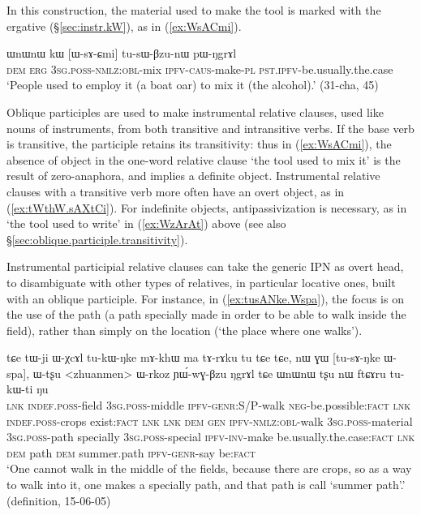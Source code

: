In this construction, the material used to make the tool is marked with the ergative (§\ref{sec:instr.kW}), as in (\ref{ex:WsACmi}).

\begin{exe}
\ex \label{ex:WsACmi}
\gll ɯnɯnɯ kɯ [ɯ-sɤ-ɕmi] tu-sɯ-βzu-nɯ pɯ-ŋgrɤl \\
\textsc{dem} \textsc{erg} \textsc{3sg}.\textsc{poss}-\textsc{nmlz}:\textsc{obl}-mix \textsc{ipfv}-\textsc{caus}-make-\textsc{pl} \textsc{pst}.\textsc{ipfv}-be.usually.the.case \\
\glt `People used to employ it (a boat oar) to mix it (the alcohol).' (31-cha, 45)
\end{exe}  

Oblique participles are used to make instrumental relative clauses, used like nouns of instruments, from both transitive and intransitive verbs. If the base verb is transitive, the participle retains its transitivity: thus in (\ref{ex:WsACmi}), the absence of object in the one-word relative clause  `the tool used to mix it' is the result of zero-anaphora, and implies a definite object. Instrumental relative clauses with a transitive verb more often have an overt object, as in (\ref{ex:tWthW.sAXtCi}). For indefinite objects, antipassivization is necessary, as in  `the tool used to write' in (\ref{ex:WzArAt}) above (see also  §\ref{sec:oblique.participle.transitivity}). 

Instrumental participial relative clauses can take the generic IPN  as overt head, to disambiguate with other types of relatives, in particular locative ones, built with an oblique participle. For instance, in (\ref{ex:tusANke.Wspa}), the focus is on the use of the path (a path specially made in order to be able to walk inside the field), rather than simply on the location (`the place where one walks').

\begin{exe}
\ex \label{ex:tusANke.Wspa}
\gll tɕe tɯ-ji ɯ-χcɤl tu-kɯ-ŋke mɤ-khɯ ma tɤ-rɤku tu tɕe tɕe, nɯ ɣɯ [tu-sɤ-ŋke ɯ-spa], ɯ-tʂu <zhuanmen> ɯ-rkoz ɲɯ́-wɣ-βzu ŋgrɤl tɕe ɯnɯnɯ tʂu nɯ ftɕɤru tu-kɯ-ti ŋu \\
\textsc{lnk} \textsc{indef}.\textsc{poss}-field \textsc{3sg}.\textsc{poss}-middle \textsc{ipfv}-\textsc{genr}:S/P-walk \textsc{neg}-be.possible:\textsc{fact} \textsc{lnk} \textsc{indef}.\textsc{poss}-crops exist:\textsc{fact} \textsc{lnk} \textsc{lnk} \textsc{dem} \textsc{gen} \textsc{ipfv}-\textsc{nmlz}:\textsc{obl}-walk \textsc{3sg}.\textsc{poss}-material \textsc{3sg}.\textsc{poss}-path specially \textsc{3sg}.\textsc{poss}-special \textsc{ipfv}-\textsc{inv}-make be.usually.the.case:\textsc{fact} \textsc{lnk} \textsc{dem} path \textsc{dem} summer.path \textsc{ipfv}-\textsc{genr}-say be:\textsc{fact} \\
\glt `One cannot walk in the middle of the fields, because there are crops, so as a way to walk into it, one makes a specially path, and that path is call `summer path'.' (definition, 15-06-05)
\end{exe} 

